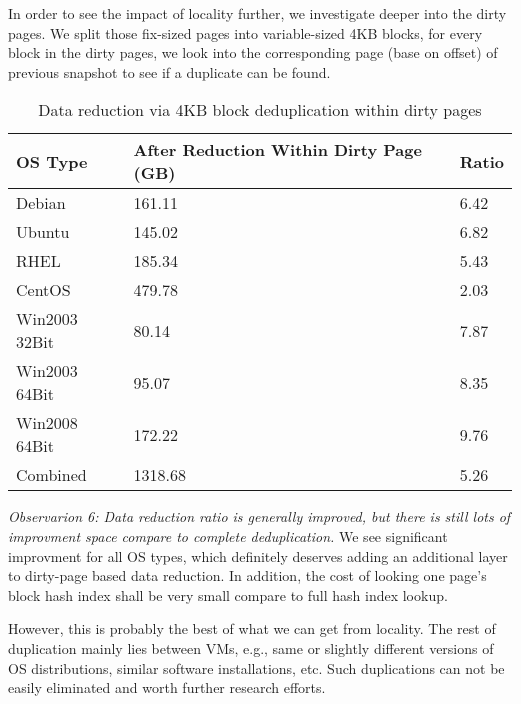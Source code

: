 In order to see the impact of locality further, we investigate deeper into the dirty pages.
We split those fix-sized pages into variable-sized 4KB blocks, for every block in the dirty pages,
we look into the corresponding
page (base on offset) of previous snapshot to see if a duplicate can be found.

\begin{table}[htb]
  \centering
    \begin{tabular}{|l|p{1.3in}|p{0.4in}|}
        \hline
        OS Type & After Reduction Within \newline Dirty Page (GB) & Ratio \\ \hline
        Debian & 161.11 & 6.42 \\ \hline
        Ubuntu & 145.02 & 6.82 \\ \hline
        RHEL & 185.34 & 5.43 \\ \hline
        CentOS & 479.78 & 2.03 \\ \hline
        Win2003 32Bit & 80.14 & 7.87 \\ \hline
        Win2003 64Bit & 95.07 & 8.35 \\ \hline
        Win2008 64Bit & 172.22 & 9.76 \\ \hline
        Combined & 1318.68 & 5.26 \\
        \hline
    \end{tabular}
    \caption{Data reduction via 4KB block deduplication within dirty pages}
    \label{tab:locality}
\end{table}

\emph{Observarion 6: Data reduction ratio is generally improved, but there is still lots of
improvment space compare to complete deduplication.} We see significant improvment for all OS
types, which definitely deserves adding an additional layer to dirty-page based 
data reduction. In addition, the cost of looking one page's block hash index
shall be very small compare to full hash index lookup.

However, this is probably the best of what we can get from locality. The rest of
duplication mainly lies between VMs, e.g., same or slightly different versions of OS distributions, 
similar software installations, etc. Such duplications can not be easily 
eliminated and worth further research efforts.
